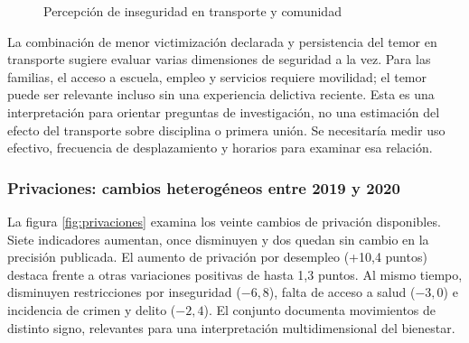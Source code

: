 \begin{figure}[htbp]\centering
{}
\caption{Percepción de inseguridad en transporte y comunidad}\label{fig:percepcion}
\end{figure}

La combinación de menor victimización declarada y persistencia del temor en
transporte sugiere evaluar varias dimensiones de seguridad a la vez. Para
las familias, el acceso a escuela, empleo y servicios requiere movilidad;
el temor puede ser relevante incluso sin una experiencia delictiva reciente.
Esta es una interpretación para orientar preguntas de investigación, no una
estimación del efecto del transporte sobre disciplina o primera unión. Se
necesitaría medir uso efectivo, frecuencia de desplazamiento y horarios para
examinar esa relación.

\subsubsection{Privaciones: cambios heterogéneos entre 2019 y 2020}
La figura \ref{fig:privaciones} examina los veinte cambios de privación disponibles.
Siete indicadores aumentan, once disminuyen y dos quedan sin cambio en la
precisión publicada. El aumento de privación por desempleo (+10,4 puntos)
destaca frente a otras variaciones positivas de hasta 1,3 puntos. Al mismo
tiempo, disminuyen restricciones por inseguridad ($-6{,}8$), falta de acceso
a salud ($-3{,}0$) e incidencia de crimen y delito ($-2{,}4$). El conjunto
documenta movimientos de distinto signo, relevantes para una interpretación
multidimensional del bienestar.

